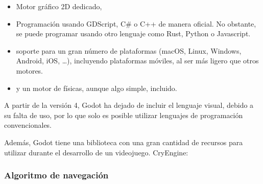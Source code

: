 \documentclass[a4paper,11pt]{book}
\begin{document}
\begin{itemize}
   \item Motor gráfico 2D dedicado, 
   \item Programación usando GDScript, C\# o C++ de manera oficial. No obstante, se puede programar usando otro lenguaje como Rust, Python o Javascript. 
   \item soporte para un gran número de plataformas (macOS, Linux, Windows, Android, iOS, \dots), incluyendo plataformas móviles, al ser más ligero que otros motores. 
   \item y un motor de físicas, aunque algo simple, incluido. 
\end{itemize}

\bigskip 

A partir de la versión 4, Godot ha dejado de incluir el lenguaje visual, debido a su falta de uso, por lo que solo es posible utilizar lenguajes de programación convencionales. %

\bigskip

Además, Godot tiene una biblioteca con una gran cantidad de recursos para utilizar durante el desarrollo de un videojuego.
CryEngine: 



\subsection{Algoritmo de navegación}
%
%
%
%
%
%
%
%
%
%
%
%
%
%
%
%
%
%
%
%
%
%
\chapter*{}
\thispagestyle{empty}
\end{document}
